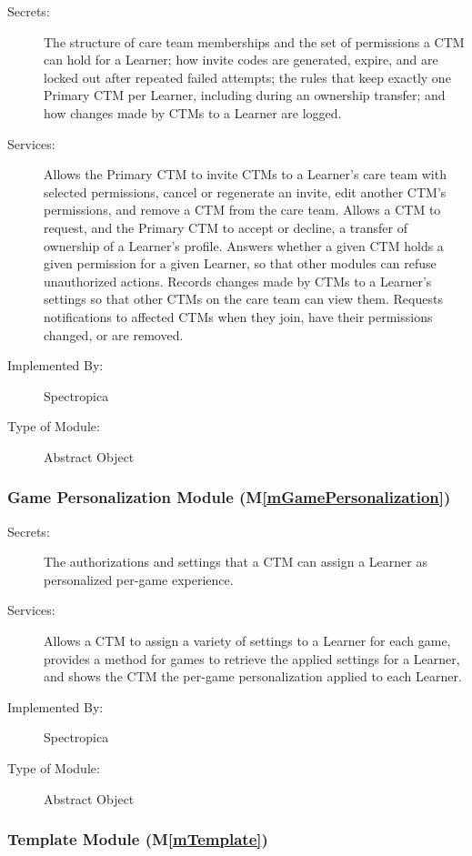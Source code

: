 \documentclass[12pt, titlepage]{article}
\newcommand{\mref}[1]{M\ref{#1}}
\begin{document}
\begin{description}
\item[Secrets:] The structure of care team memberships and the set of
  permissions a CTM can hold for a Learner; how invite codes are generated,
  expire, and are locked out after repeated failed attempts; the rules that
  keep exactly one Primary CTM per Learner, including during an ownership
  transfer; and how changes made by CTMs to a Learner are logged.
\item[Services:] Allows the Primary CTM to invite CTMs to a Learner's care team
  with selected permissions, cancel or regenerate an invite, edit another CTM's
  permissions, and remove a CTM from the care team. Allows a CTM to request,
  and the Primary CTM to accept or decline, a transfer of ownership of a
  Learner's profile. Answers whether a given CTM holds a given permission for a
  given Learner, so that other modules can refuse unauthorized actions. Records
  changes made by CTMs to a Learner's settings so that other CTMs on the care
  team can view them. Requests notifications to affected CTMs when they join,
  have their permissions changed, or are removed.
\item[Implemented By:] Spectropica
\item[Type of Module:] Abstract Object
\end{description}

\subsubsection{Game Personalization Module (\mref{mGamePersonalization})}

\begin{description}
\item[Secrets:] The authorizations and settings that a CTM can assign a Learner as personalized per-game experience.
\item[Services:] Allows a CTM to assign a variety of settings to a Learner for each game, provides a method for games to retrieve the applied settings for a Learner, and shows the CTM the per-game personalization applied to each Learner.
\item[Implemented By:] Spectropica
\item[Type of Module:] Abstract Object
\end{description}

\subsubsection{Template Module (\mref{mTemplate})}
\end{document}
